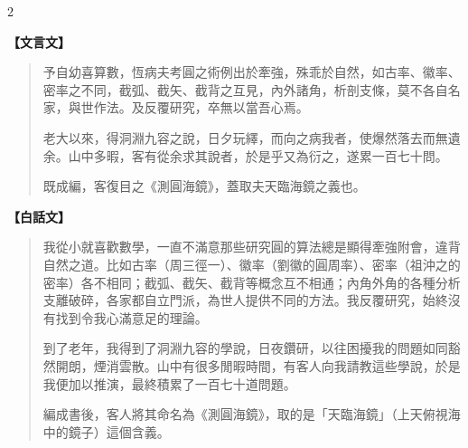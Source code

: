 \documentclass[11pt,a4paper]{article}
\begin{document}
\begin{paracol}{2}
{\color{prefacecolor}
\textbf{【文言文】}

\begin{quote}
予自幼喜算數，恆病夫考圓之術例出於牽強，殊乖於自然，如古率、徽率、密率之不同，截弧、截矢、截背之互見，內外諸角，析剖支條，莫不各自名家，與世作法。及反覆研究，卒無以當吾心焉。

老大以來，得洞淵九容之說，日夕玩繹，而向之病我者，使爆然落去而無遺余。山中多暇，客有從余求其說者，於是乎又為衍之，遂累一百七十問。

既成編，客復目之《測圓海鏡》，蓋取夫天臨海鏡之義也。
\end{quote}
}

\switchcolumn
{\color{prefacecolor}
\textbf{【白話文】}

\begin{quote}
我從小就喜歡數學，一直不滿意那些研究圓的算法總是顯得牽強附會，違背自然之道。比如古率（周三徑一）、徽率（劉徽的圓周率）、密率（祖沖之的密率）各不相同；截弧、截矢、截背等概念互不相通；內角外角的各種分析支離破碎，各家都自立門派，為世人提供不同的方法。我反覆研究，始終沒有找到令我心滿意足的理論。

到了老年，我得到了洞淵九容的學說，日夜鑽研，以往困擾我的問題如同豁然開朗，煙消雲散。山中有很多閒暇時間，有客人向我請教這些學說，於是我便加以推演，最終積累了一百七十道問題。

編成書後，客人將其命名為《測圓海鏡》，取的是「天臨海鏡」（上天俯視海中的鏡子）這個含義。
\end{quote}
}
\end{paracol}

\vspace{0.5cm}
\end{document}
